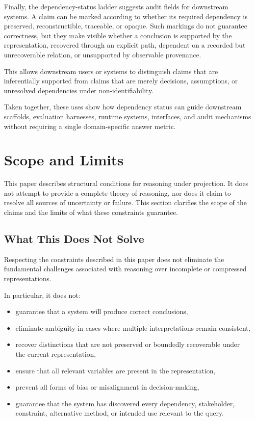 \documentclass[11pt]{article}
\theoremstyle{definition}
\theoremstyle{remark}
\begin{document}
Finally, the dependency-status ladder suggests audit fields for downstream systems. A claim can be marked according to whether its required dependency is preserved, reconstructible, traceable, or opaque. Such markings do not guarantee correctness, but they make visible whether a conclusion is supported by the representation, recovered through an explicit path, dependent on a recorded but unrecoverable relation, or unsupported by observable provenance.

This allows downstream users or systems to distinguish claims that are inferentially supported from claims that are merely decisions, assumptions, or unresolved dependencies under non-identifiability.

Taken together, these uses show how dependency status can guide downstream scaffolds, evaluation harnesses, runtime systems, interfaces, and audit mechanisms without requiring a single domain-specific answer metric.

\section{Scope and Limits}

This paper describes structural conditions for reasoning under projection. It does not attempt to provide a complete theory of reasoning, nor does it claim to resolve all sources of uncertainty or failure. This section clarifies the scope of the claims and the limits of what these constraints guarantee.

\subsection{What This Does Not Solve}

Respecting the constraints described in this paper does not eliminate the fundamental challenges associated with reasoning over incomplete or compressed representations.

In particular, it does not:

\begin{itemize}[leftmargin=1.5em]
    \item guarantee that a system will produce correct conclusions,
    \item eliminate ambiguity in cases where multiple interpretations remain consistent,
    \item recover distinctions that are not preserved or boundedly recoverable under the current representation,
    \item ensure that all relevant variables are present in the representation,
    \item prevent all forms of bias or misalignment in decision-making,
    \item guarantee that the system has discovered every dependency, stakeholder, constraint, alternative method, or intended use relevant to the query.
\end{itemize}
\end{document}
